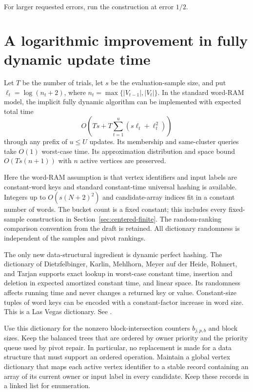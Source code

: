 \documentclass[11pt]{article}
\begin{document}
For larger requested errors, run the construction at error $1/2$.

\section{A logarithmic improvement in fully dynamic update time}
\label{sec:hashing}

Let $T$ be the number of trials, let $s$ be the evaluation-sample size,
and put $\ell_t=\log(n_t+2)$, where
$n_t=\max\{|V_{t-1}|,|V_t|\}$. In the standard word-RAM model, the
implicit fully dynamic algorithm can be implemented with expected total
time
\[
 O\!\left(Ts+T\sum_{t=1}^{u}(s\ell_t+\ell_t^2)\right)
\]
through any prefix of $u\le U$ updates. Its membership and same-cluster
queries take $O(1)$ worst-case time. Its approximation distribution and
space bound $O(Ts(n+1))$ with $n$ active vertices are preserved.

Here the word-RAM assumption is that vertex identifiers and input labels
are constant-word keys and standard constant-time universal hashing is
available. Integers up to $O(s(N+2)^2)$ and candidate-array indices
fit in a constant number of words. The bucket count is a fixed constant;
this includes every fixed-sample construction in Section~\ref{sec:centered-finite}. The random-ranking comparison convention from the draft is
retained. All dictionary randomness is independent of the samples and
pivot rankings.

The only new data-structural ingredient is dynamic perfect hashing. The
dictionary of Dietzfelbinger, Karlin, Mehlhorn, Meyer auf der Heide,
Rohnert, and Tarjan supports exact lookup in worst-case constant time,
insertion and deletion in expected amortized constant time, and linear
space. Its randomness affects running time and never changes a returned
key or value. Constant-size tuples of word keys can be encoded with a
constant-factor increase in word size. This is a Las Vegas dictionary.
See \cite{perfecthash}.

Use this dictionary for the nonzero block-intersection counters
$b_{j,p,b}$ and block sizes. Keep the balanced trees that are ordered by
owner priority and the priority queue used by pivot repair. In
particular, no replacement is made for a data structure that must support
an ordered operation. Maintain a global vertex dictionary that maps each
active vertex identifier to a stable record containing an array of its
current owner or input label in every candidate. Keep these records in a
linked list for enumeration.
\end{document}
